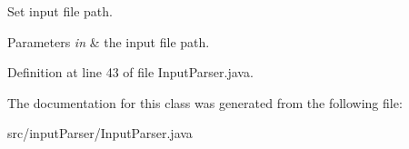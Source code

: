 Set input file path. 


\begin{DoxyParams}{Parameters}
{\em in} & the input file path. \\
\hline
\end{DoxyParams}


Definition at line 43 of file Input\-Parser.\-java.



The documentation for this class was generated from the following file\-:\begin{DoxyCompactItemize}
\item 
src/input\-Parser/Input\-Parser.\-java\end{DoxyCompactItemize}
